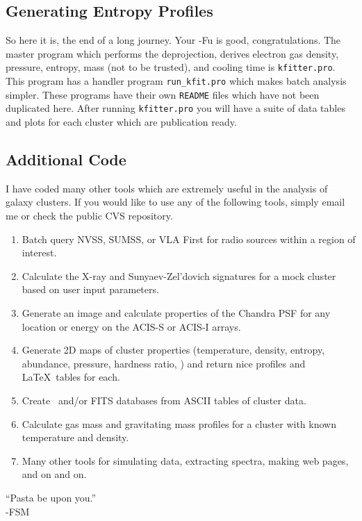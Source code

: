 \subsection{Generating Entropy Profiles}

So here it is, the end of a long journey. Your \ciao-Fu is good,
congratulations. The master program which performs the deprojection,
derives electron gas density, pressure, entropy, mass (not to be
trusted), and cooling time is {\tt{kfitter.pro}}. This program has a
handler program {\tt{run\_kfit.pro}} which makes batch analysis
simpler. These programs have their own {\tt{README}} files which have
not been duplicated here. After running {\tt{kfitter.pro}} you will
have a suite of data tables and plots for each cluster which are
publication ready.

\subsection{Additional Code}

I have coded many other tools which are extremely useful in the
analysis of galaxy clusters. If you would like to use any of the
following tools, simply email me or check the public CVS repository.
\begin{enumerate}
\item Batch query NVSS, SUMSS, or VLA First for radio sources within a
region of interest.
\item Calculate the X-ray and Sunyaev-Zel'dovich signatures for a mock
cluster based on user input parameters.
\item Generate an image and calculate properties of the Chandra PSF
for any location or energy on the ACIS-S or ACIS-I arrays.
\item Generate 2D maps of cluster properties (temperature, density,
entropy, abundance, pressure, hardness ratio, \etc) and return nice
profiles and \LaTeX\ tables for each.
\item Create \mysql\ and/or FITS databases from ASCII tables of
cluster data.
\item Calculate gas mass and gravitating mass profiles for a cluster
with known temperature and density.
\item Many other tools for simulating data, extracting spectra, making
web pages, and on and on.
\end{enumerate}

``Pasta be upon you.''\\
-FSM